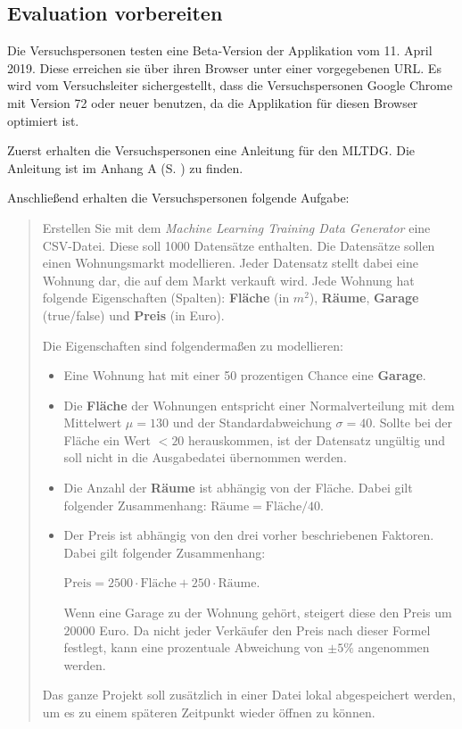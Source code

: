\subsection{Evaluation vorbereiten}

Die Versuchspersonen testen eine Beta-Version der Applikation vom 11. April 2019. Diese erreichen sie über ihren Browser unter einer vorgegebenen URL. Es wird vom Versuchsleiter sichergestellt, dass die Versuchspersonen Google Chrome mit Version 72 oder neuer benutzen, da die Applikation für diesen Browser optimiert ist.

Zuerst erhalten die Versuchspersonen eine Anleitung für den \ac{MLTDG}. Die Anleitung ist im Anhang A (S. \pageref{apx:manual}) zu finden.

Anschließend erhalten die Versuchspersonen folgende Aufgabe:

\begin{quote}
    
    Erstellen Sie mit dem \textit{Machine Learning Training Data Generator} eine \ac{CSV}-Datei. Diese soll 1000 Datensätze enthalten. Die Datensätze sollen einen Wohnungsmarkt modellieren. Jeder Datensatz stellt dabei eine Wohnung dar, die auf dem Markt verkauft wird. Jede Wohnung hat folgende Eigenschaften (Spalten): \textbf{Fläche} (in $m^2$), \textbf{Räume}, \textbf{Garage} (true/false) und \textbf{Preis} (in Euro).

    Die Eigenschaften sind folgendermaßen zu modellieren:
    \begin{itemize}
        \item Eine Wohnung hat mit einer 50 prozentigen Chance eine \textbf{Garage}.
        \item Die \textbf{Fläche} der Wohnungen entspricht einer Normalverteilung mit dem Mittelwert $\mu = 130$ und der Standardabweichung $\sigma = 40$. Sollte bei der Fläche ein Wert $< 20$ herauskommen, ist der Datensatz ungültig und soll nicht in die Ausgabedatei übernommen werden.
        \item Die Anzahl der \textbf{Räume} ist abhängig von der Fläche. Dabei gilt folgender Zusammenhang: $\textrm{Räume} = \textrm{Fläche} / 40$.
        \item Der Preis ist abhängig von den drei vorher beschriebenen Faktoren. Dabei gilt folgender Zusammenhang:
        
        $\textrm{Preis} = 2500 \cdot \textrm{Fläche} + 250 \cdot \textrm{Räume}$.
        
        Wenn eine Garage zu der Wohnung gehört, steigert diese den Preis um $20000$ Euro. Da nicht jeder Verkäufer den Preis nach dieser Formel festlegt, kann eine prozentuale Abweichung von $\pm 5\%$ angenommen werden.
    \end{itemize}

    Das ganze Projekt soll zusätzlich in einer Datei lokal abgespeichert werden, um es zu einem späteren Zeitpunkt wieder öffnen zu können.

\end{quote}

